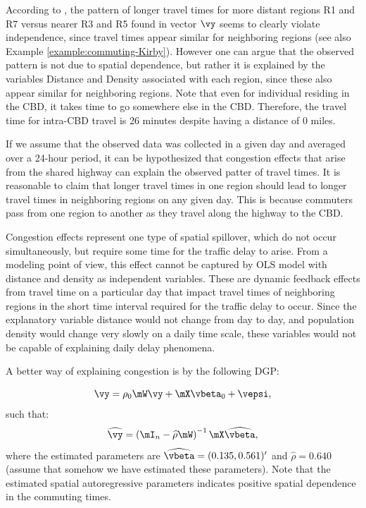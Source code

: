\documentclass[english,12pt]{book}\usepackage[]{graphicx}\usepackage[]{xcolor}
\begin{document}
According to \cite{lesage2010introduction}, the pattern of longer travel times for more distant regions R1 and R7 versus nearer R3 and R5 found in vector $\vy$ seems to clearly violate independence, since travel times appear similar for neighboring regions (see also Example \ref{example:commuting-Kirby}). However one can argue that the observed pattern is not due to spatial dependence, but rather it is explained by the variables Distance and Density associated with each region, since these also appear similar for neighboring regions. Note that even for individual residing in the CBD, it takes time to go somewhere else in the CBD. Therefore, the travel time for intra-CBD travel is 26 minutes despite having a distance of 0 miles. 

If we assume that the observed data was collected in a given day and averaged over a 24-hour period, it can be hypothesized that congestion effects that arise from the shared highway can explain the observed patter of travel times.  It is reasonable to claim that longer travel times in one region should lead to longer travel times in neighboring regions on any given day. This is because commuters pass from one region to another as they travel along the highway to the CBD.

Congestion effects represent one type of spatial spillover, which do not occur simultaneously, but require some time for the traffic delay to arise. From a modeling point of view, this effect cannot be captured by OLS model with distance and density as independent variables. These are dynamic feedback effects from travel time on a particular day that impact travel times of neighboring regions in the short time interval required for the traffic delay to occur. Since the explanatory variable distance would not change from day to day, and population density would change very slowly on a daily time scale, these variables would not be capable of explaining daily delay phenomena. 

A better way of explaining congestion is by the following DGP: 

\begin{equation*}
\vy = \rho_0\mW\vy + \mX\vbeta_0 + \vepsi, 
\end{equation*}
%
such that:
\begin{equation*}
\widehat{\vy} = \left(\mI_n - \widehat{\rho}\mW\right)^{-1}\mX\widehat{\vbeta},
\end{equation*}
%
where the estimated parameters are $\widehat{\vbeta} = (0.135, 0.561)'$ and $\widehat{\rho} = 0.640$ (assume that somehow we have estimated these parameters). Note that the estimated spatial autoregressive parameters indicates positive spatial dependence in the commuting times. 
\end{document}
